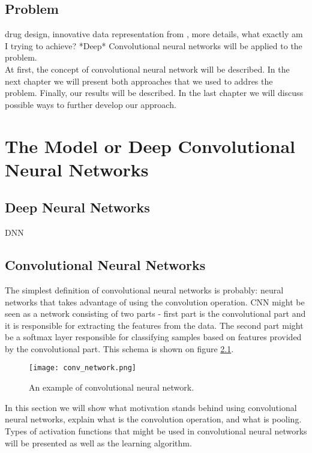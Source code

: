 \documentclass[a4paper,10pt]{report}
\begin{document}
    \section{Problem} %
    drug design, innovative data representation from \cite{2DSIFT}, more details, what exactly am I trying to achieve? *Deep* Convolutional neural networks will be applied to the problem.\\
    
    At first, the concept of convolutional neural network will be described. In the next chapter we will present both approaches that we used to addres the problem. Finally, our results will be described. In the last chapter we will discuss possible ways to further develop our approach.
    

  \chapter{The Model or Deep Convolutional Neural Networks}
    
    \section{Deep Neural Networks}
      DNN

    \section{Convolutional Neural Networks}
      The simplest definition of convolutional neural networks is probably: neural networks that takes advantage of using the convolution operation. CNN might be seen as a network consisting of two parts - first part is the convolutional part and it is responsible for extracting the features from the data. The second part might be a softmax layer responsible for classifying samples based on features provided by the convolutional part. This schema is shown on figure \ref{fig:con_network}.\\
      
     \begin{figure}[h!]
	  \centering
	  \texttt{[image: conv\_network.png]}
	  \caption{An example of convolutional neural network.}
	  \label{fig:con_network}
	\end{figure} 
      
      In this section we will show what motivation stands behind using convolutional neural networks, explain what is the convolution operation, and what is pooling. Types of activation functions that might be used in convolutional neural networks
      will be presented as well as the learning algorithm.\\
      
\end{document}
